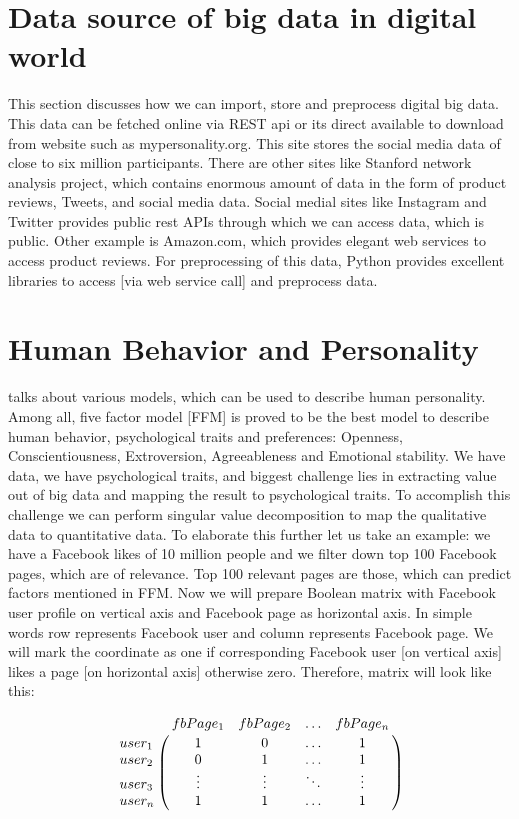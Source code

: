 \documentclass[sigconf]{acmart}
\begin{document}
 
 \section{Data source of big data in digital world}
 
 This section discusses how we can import, store and preprocess digital big data. This data can be fetched online via REST api or its direct available to download from website such as mypersonality.org. This site stores the social media data of close to six million participants. There are other sites like Stanford network analysis project, which contains enormous amount of data in the form of product reviews, Tweets, and social media data. Social medial sites like Instagram and Twitter provides public rest APIs through which we can access data, which is public. Other example is Amazon.com, which provides elegant web services to access product reviews. For preprocessing of this data, Python provides excellent libraries to access [via web service call] and preprocess data. 
 
 \section{Human Behavior and Personality }
\cite{ref11} talks about various models, which can be used to describe human personality. Among all, five factor model [FFM] is proved to be the best model to describe human behavior, psychological traits and preferences: Openness, Conscientiousness, Extroversion, Agreeableness and Emotional stability. We have data, we have psychological traits, and biggest challenge lies in extracting value out of big data and mapping the result to psychological traits. To accomplish this challenge we can perform singular value decomposition to map the qualitative data to quantitative data. To elaborate this further let us take an example: we have a Facebook likes of 10 million people and we filter down top 100 Facebook pages, which are of relevance. Top 100 relevant pages are those, which can predict factors mentioned in FFM. Now we will prepare Boolean matrix with Facebook user profile on vertical axis and Facebook page as horizontal axis. In simple words row represents Facebook user and column represents Facebook page. We will mark the coordinate as one if corresponding Facebook user [on vertical axis] likes a page [on horizontal axis] otherwise zero. Therefore, matrix will look like this:

$$\bordermatrix{\text{}&fbPage_1 &fbPage_2&\ldots &fbPage_n\cr
                user_1&1 &  0  & \ldots & 1\cr
                user_2& 0  &  1 & \ldots & 1\cr
                user_3& \vdots & \vdots & \ddots & \vdots\cr
                user_n& 1  &   1       &\ldots & 1}$$
\end{document}
